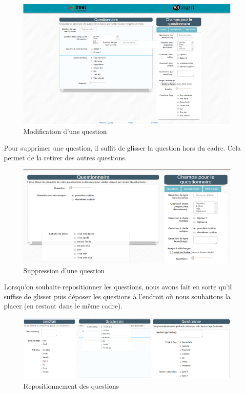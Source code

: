 \begin{figure}[H]
    \begin{center}
	\includegraphics[scale=0.8]{img/questionnaire/generateur}
    \end{center}
    \caption{Modification d'une question}
\end{figure}
 
 
Pour supprimer une question, il suffit de glisser la question hors du cadre. Cela permet de la retirer des autres questions.


\begin{figure}[H]
    \begin{center}
	\includegraphics[scale=0.8]{img/questionnaire/suppresion}
    \end{center}
    \caption{Suppression d'une question}
\end{figure}


Lorsqu'on souhaite repositionner les questions, nous avons fait en sorte qu'il suffise de glisser puis déposer les questions à l'endroit où nous souhaitons la placer (en restant dans le même cadre).



\begin{figure}[H]
    \begin{center}
	\includegraphics[scale=0.8]{img/questionnaire/repositionnement}
    \end{center}
    \caption{Repositionnement des questions}
\end{figure}


